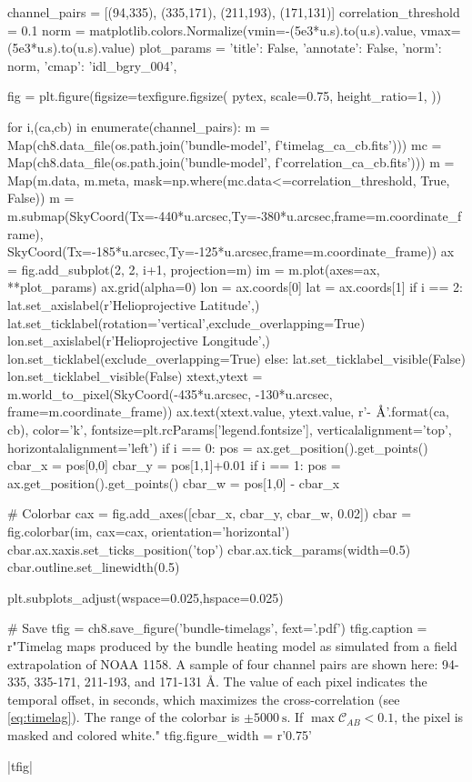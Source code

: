 \begin{pycode}[chapter8]
channel_pairs = [(94,335), (335,171), (211,193), (171,131)]
correlation_threshold = 0.1
norm = matplotlib.colors.Normalize(vmin=-(5e3*u.s).to(u.s).value,
                                   vmax=(5e3*u.s).to(u.s).value)
plot_params = { 'title': False, 'annotate': False, 'norm': norm, 'cmap': 'idl_bgry_004',}

fig = plt.figure(figsize=texfigure.figsize(
    pytex,
    scale=0.75,
    height_ratio=1,
))

for i,(ca,cb) in enumerate(channel_pairs):
    m = Map(ch8.data_file(os.path.join('bundle-model', f'timelag_{ca}_{cb}.fits')))
    mc = Map(ch8.data_file(os.path.join('bundle-model', f'correlation_{ca}_{cb}.fits')))
    m = Map(m.data, m.meta, mask=np.where(mc.data<=correlation_threshold, True, False))
    m = m.submap(SkyCoord(Tx=-440*u.arcsec,Ty=-380*u.arcsec,frame=m.coordinate_frame),
                 SkyCoord(Tx=-185*u.arcsec,Ty=-125*u.arcsec,frame=m.coordinate_frame))
    ax = fig.add_subplot(2, 2, i+1, projection=m)
    im = m.plot(axes=ax, **plot_params)
    ax.grid(alpha=0)
    lon = ax.coords[0]
    lat = ax.coords[1]
    if i == 2:
        lat.set_axislabel(r'Helioprojective Latitude',)
        lat.set_ticklabel(rotation='vertical',exclude_overlapping=True)
        lon.set_axislabel(r'Helioprojective Longitude',)
        lon.set_ticklabel(exclude_overlapping=True)
    else:
        lat.set_ticklabel_visible(False)
        lon.set_ticklabel_visible(False)
    xtext,ytext = m.world_to_pixel(SkyCoord(-435*u.arcsec, -130*u.arcsec, frame=m.coordinate_frame))
    ax.text(xtext.value, ytext.value, r'{}-{} $\si{{\angstrom}}$'.format(ca, cb),
            color='k', fontsize=plt.rcParams['legend.fontsize'],
            verticalalignment='top', horizontalalignment='left')
    if i == 0:
        pos = ax.get_position().get_points()
        cbar_x = pos[0,0]
        cbar_y = pos[1,1]+0.01
    if i == 1:
        pos = ax.get_position().get_points()
        cbar_w = pos[1,0] - cbar_x 

# Colorbar
cax = fig.add_axes([cbar_x, cbar_y, cbar_w, 0.02])
cbar = fig.colorbar(im, cax=cax, orientation='horizontal')
cbar.ax.xaxis.set_ticks_position('top')
cbar.ax.tick_params(width=0.5)
cbar.outline.set_linewidth(0.5)

plt.subplots_adjust(wspace=0.025,hspace=0.025)

# Save
tfig = ch8.save_figure('bundle-timelags', fext='.pdf')
tfig.caption = r"Timelag maps produced by the bundle heating model as simulated from a field extrapolation of \AR{} NOAA 1158. A sample of four channel pairs are shown here: 94-335, 335-171, 211-193, and 171-131 \si{\angstrom}. The value of each pixel indicates the temporal offset, in seconds, which maximizes the cross-correlation (see \autoref{eq:timelag}). The range of the colorbar is $\pm\SI{5000}{\second}$. If $\max{\mathcal{C}_{AB}}<0.1$, the pixel is masked and colored white."
tfig.figure_width = r'0.75\textwidth'
\end{pycode}
\py[chapter8]|tfig|

